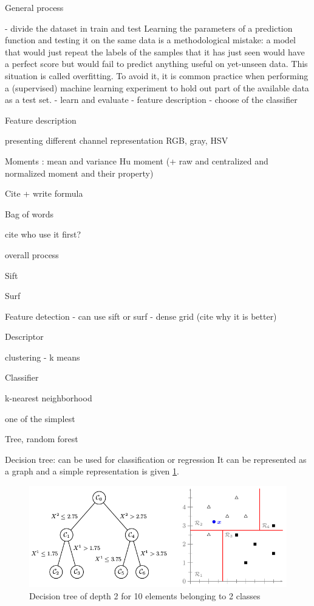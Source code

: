 General process

- divide the dataset in train and test
Learning the parameters of a prediction function and testing it on the same data is a methodological mistake: a model that would just repeat the labels of the samples that it has just seen would have a perfect score but would fail to predict anything useful on yet-unseen data. This situation is called overfitting. To avoid it, it is common practice when performing a (supervised) machine learning experiment to hold out part of the available data as a test set.
- learn and evaluate
- feature description
- choose of the classifier

Feature description

presenting different channel representation
RGB, gray, HSV

Moments :
mean and variance
Hu moment (+ raw and centralized and normalized moment and their property)

Cite + write formula

Bag of words

cite who use it first?

overall process

Sift

Surf

Feature detection
- can use sift or surf
- dense grid (cite why it is better)

Descriptor

clustering
- k means

Classifier

k-nearest neighborhood

one of the simplest

Tree, random forest

Decision tree: can be used for classification or regression
It can be represented as a graph and a simple representation is given \ref{fig:decision_tree_simple_example}.

\begin{figure}[h]
    \includegraphics[scale=0.5]{img/decision_tree_simple_example}
    \caption{Decision tree of depth 2 for 10 elements belonging to 2 classes}
    \label{fig:decision_tree_simple_example}
\end{figure}


